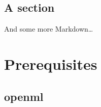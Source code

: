 \documentclass[letterpaper,10pt,english]{jupyterBook}
\begin{document}
\section{A section}
\label{\detokenize{prereq:a-section}}
\sphinxAtStartPar
And some more Markdown…


\chapter{Prerequisites}
\label{\detokenize{prereq:prerequisites}}
\sphinxAtStartPar
{}


\section{openml}
\label{\detokenize{prereq:openml}}
\sphinxstepscope
\end{document}
